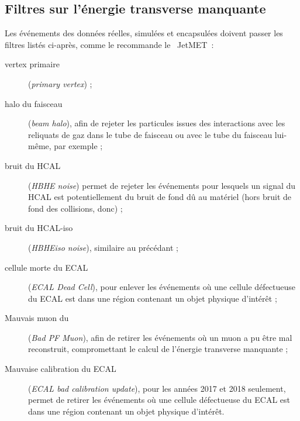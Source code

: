 \subsection{Filtres sur l'énergie transverse manquante}\label{chapter-HTT_analysis-section-MET_filters}
Les événements des données réelles, simulées et encapsulées doivent passer les filtres listés ci-après, comme le recommande le \POG\ JetMET~\cite{MET_filters}:
\begin{description}
\item[vertex primaire] (\emph{primary vertex}) ;
\item[halo du faisceau] (\emph{beam halo}), afin de rejeter les particules issues des interactions avec les reliquats de gaz dans le tube de faisceau ou avec le tube du faisceau lui-même, par exemple ;
\item[bruit du HCAL] (\emph{HBHE noise}) permet de rejeter les événements pour lesquels un signal du HCAL est potentiellement du bruit de fond dû au matériel (hors bruit de fond des collisions, donc) ;
\item[bruit du HCAL-iso] (\emph{HBHEiso noise}), similaire au précédant ;
\item[cellule morte du ECAL] (\emph{ECAL Dead Cell}), pour enlever les événements où une cellule défectueuse du ECAL est dans une région contenant un objet physique d'intérêt ;
\item[Mauvais muon du \PF] (\emph{Bad PF Muon}), afin de retirer les événements où un muon a pu être mal reconstruit, compromettant le calcul de l'énergie transverse manquante ;
\item[Mauvaise calibration du ECAL] (\emph{ECAL bad calibration update}), pour les années 2017 et 2018 seulement, permet de retirer les événements où une cellule défectueuse du ECAL est dans une région contenant un objet physique d'intérêt.
\end{description}